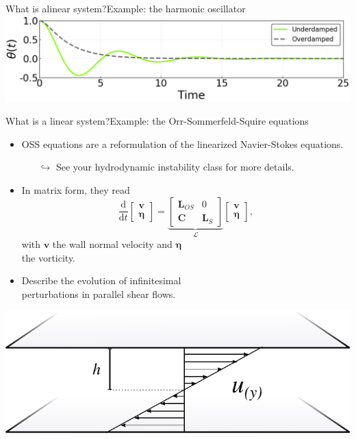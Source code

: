 \documentclass[usenames,dvipsnames,svgnames,10pt,aspectratio=169]{beamer}
\begin{document}
\begin{frame}[t, c]{What is alinear system?}{Example: the harmonic oscillator}
	\centering
	\includegraphics[width=.9\textwidth]{harmonic_oscillator_regimes}
	\vspace{1cm}
\end{frame}

\begin{frame}[t, c]{What is a linear system?}{Example: the Orr-Sommerfeld-Squire equations}
	\begin{minipage}{.58\textwidth}
		\begin{itemize}
			\item OSS equations are a reformulation of the linearized Navier-Stokes equations.
			\begin{itemize}
				\item[\( \hookrightarrow \)] See your hydrodynamic instability class for more details.
			\end{itemize}

			\medskip

			\item In matrix form, they read
			\[
				\displaystyle \frac{\mathrm{d}}{\mathrm{d}t} \begin{bmatrix} \bm{v} \\ \bm{\eta} \end{bmatrix} = \underbrace{\begin{bmatrix} \bm{L}_{OS} & 0 \\ \bm{C} & \bm{L}_S \end{bmatrix}}_{\mathcal{L}} \begin{bmatrix} \bm{v} \\ \bm{\eta} \end{bmatrix},
			\]
			with \(\bm{v}\) the wall normal velocity and \(\bm{\eta}\)\\ the vorticity.

			\medskip

			\item Describe the evolution of infinitesimal \\ perturbations in parallel shear flows.
		\end{itemize}
	\end{minipage}%
	\hfill
	\begin{minipage}{.38\textwidth}
		\includegraphics[width=\textwidth]{Couette_flow}


\end{minipage}
\end{frame}
\end{document}
